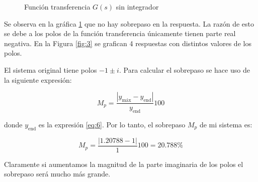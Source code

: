 \begin{figure}[ht!]
    \centering
    \caption{Función transferencia $G(s)$ sin integrador}
    \label{fig:2}
\end{figure}



Se observa en la gráfica \ref{fig:2} que no hay sobrepaso en la respuesta. La razón de esto se debe a los polos de la función transferencia únicamente tienen parte real negativa. En la Figura \ref{fig:3} se grafican 4 respuestas con distintos valores de los polos.

El sistema original tiene polos $-1\pm i$. Para calcular el sobrepaso se hace uso de la siguiente expresión:

\begin{equation}
    M_p = \frac{|y_{\text{máx}} - y_{\text{end}}|}{y_{\text{end}}}100
\end{equation}

\noindent donde $y_{\text{end}}$ es la expresión \ref{eq:6}. Por lo tanto, el sobrepaso $M_p$ de mi sistema es:

\begin{equation}
    M_p = \frac{|1.20788 - 1|}{1}100 = 20.788\%
\end{equation}

Claramente si aumentamos la magnitud de la parte imaginaria de los polos el sobrepaso será mucho más grande.

